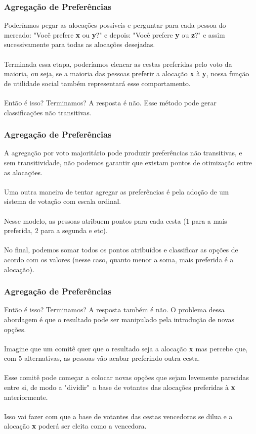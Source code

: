 \documentclass{beamer}[10]
\begin{document}
\begin{frame}
	\frametitle{Agregação de Preferências}

	Poderíamos pegar as alocações possíveis e perguntar para cada pessoa do mercado: "Você prefere \textbf{x} ou \textbf{y}?" e depois: "Você prefere \textbf{y} ou \textbf{z}?" e assim sucessivamente para todas as alocações desejadas.
	\\~\\
	Terminada essa etapa, poderíamos elencar as cestas preferidas pelo voto da maioria, ou seja, se a maioria das pessoas preferir a alocação \textbf{x} à \textbf{y}, nossa função de utilidade social também representará esse comportamento.
	\\~\\
	Então é isso? Terminamos? A resposta é não. Esse método pode gerar classificações não transitivas.

\end{frame}

\begin{frame}
	\frametitle{Agregação de Preferências}

	A agregação por voto majoritário pode produzir preferências não transitivas, e sem transitividade, não podemos garantir que existam pontos de otimização entre as alocações.
	\\~\\
	Uma outra maneira de tentar agregar as preferências é pela adoção de um sistema de votação com escala ordinal.
	\\~\\
	Nesse modelo, as pessoas atribuem pontos para cada cesta (1 para a mais preferida, 2 para a segunda e etc).
	\\~\\
	No final, podemos somar todos os pontos atribuídos e classificar as opções de acordo com os valores (nesse caso, quanto menor a soma, mais preferida é a alocação).

\end{frame}

\begin{frame}
	\frametitle{Agregação de Preferências}

	Então é isso? Terminamos? A resposta também é não. O problema dessa abordagem é que o resultado pode ser manipulado pela introdução de novas opções.
	\\~\\
	Imagine que um comitê quer que o resultado seja a alocação \textbf{x} mas percebe que, com 5 alternativas, as pessoas vão acabar preferindo outra cesta.
	\\~\\
	Esse comitê pode começar a colocar novas opções que sejam levemente parecidas entre si, de modo a "dividir"\ a base de votantes das alocações preferidas à \textbf{x} anteriormente.
	\\~\\
	Isso vai fazer com que a base de votantes das cestas vencedoras se dilua e a alocação \textbf{x} poderá ser eleita como a vencedora.

\end{frame}
\end{document}
